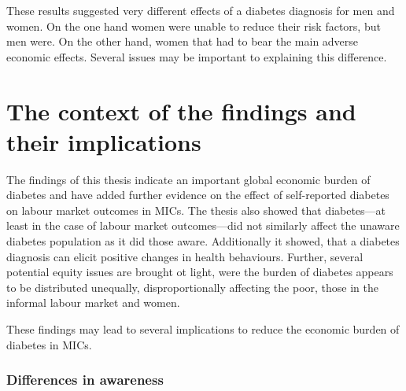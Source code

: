 These results suggested very different effects of a diabetes diagnosis for men and women. On the one hand women were unable to reduce their risk factors, but men were. On the other hand, women that had to bear the main adverse economic effects. Several issues may be important to explaining this difference. 

\section{The context of the findings and their implications}

The findings of this thesis indicate an important global economic burden of diabetes and have added further evidence on the effect of self-reported diabetes on labour market outcomes in \acp{MIC}. The thesis also showed that diabetes---at least in the case of labour market outcomes---did not similarly affect the unaware diabetes population as it did those aware. Additionally it showed, that a diabetes diagnosis can elicit positive changes in health behaviours. Further, several potential equity issues are brought ot light, were the burden of diabetes appears to be distributed unequally, disproportionally affecting the poor, those in the informal labour market and women.

These findings may lead to several implications to reduce the economic burden of diabetes in \acp{MIC}. 

\subsubsection*{Differences in awareness}

